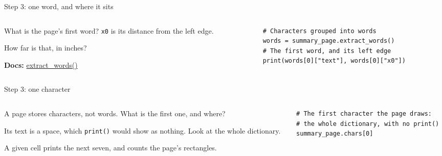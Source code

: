 \documentclass[9pt,aspectratio=169]{beamer}
\begin{document}
\begin{frame}[fragile]{Step 3: one word, and where it sits}
    \begin{columns}[T]
        \begin{column}{0.37\textwidth}
            What is the page's first word? \texttt{x0} is its distance from the left edge.

            \medskip
            How far is that, in inches?

            \medskip
            {\scriptsize\textbf{Docs:} \href{https://github.com/jsvine/pdfplumber\#extracting-text}{extract\_words()}\par}
        \end{column}
        \begin{column}{0.6\textwidth}
\begin{lstlisting}
# Characters grouped into words
words = summary_page.extract_words()
# The first word, and its left edge
print(words[0]["text"], words[0]["x0"])
\end{lstlisting}
        \end{column}
    \end{columns}
\end{frame}

\begin{frame}[fragile]{Step 3: one character}
    \begin{columns}[T]
        \begin{column}{0.37\textwidth}
            A page stores characters, not words. What is the first one, and where?

            \medskip
            Its text is a space, which \texttt{print()} would show as nothing. Look at the whole dictionary.

            \medskip
            A given cell prints the next seven, and counts the page's rectangles.
        \end{column}
        \begin{column}{0.6\textwidth}
\begin{lstlisting}
# The first character the page draws:
# the whole dictionary, with no print()
summary_page.chars[0]
\end{lstlisting}
        \end{column}
    \end{columns}
\end{frame}
\end{document}
